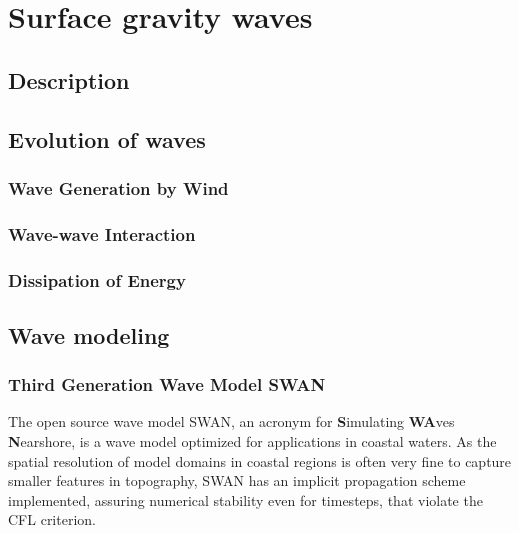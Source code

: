 \chapter{Surface gravity waves}
\label{kap-waves}

\section{Description}

\section{Evolution of waves}

\subsection{Wave Generation by Wind}



\subsection{Wave-wave Interaction}

\subsection{Dissipation of Energy}

\section{Wave modeling}

\subsection{Third Generation Wave Model SWAN}

The open source wave model SWAN, an acronym for \textbf{S}imulating \textbf{WA}ves \textbf{N}earshore, is a wave model optimized for applications in coastal waters. As the spatial resolution of model domains in coastal regions is often very fine to capture smaller features in topography, SWAN has an implicit propagation scheme implemented, assuring numerical stability even for timesteps, that violate the CFL criterion. 

